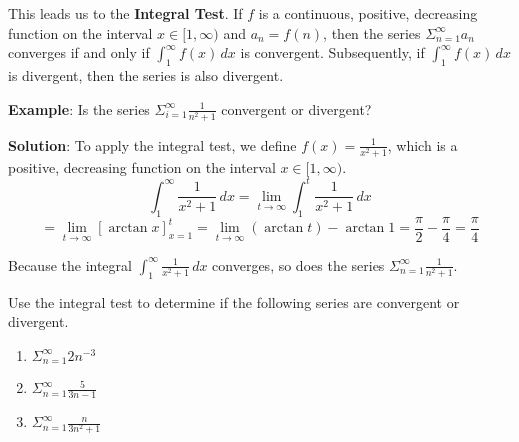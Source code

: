 This leads us to the \textbf{Integral Test}. If $f$ is a continuous, positive, 
decreasing function on the interval $x \in [1, \infty)$ and $a_n = f(n)$, then 
the series $\Sigma_{n=1}^\infty a_n$ converges if and only if $\int_1^\infty 
f(x)\,dx$ is convergent. Subsequently, if $\int_1^\infty f(x)\,dx$ is 
divergent, then the series is also divergent.

\textbf{Example}: Is the series $\Sigma_{i = 1}^\infty \frac{1}{n^2 + 1}$ 
convergent or divergent?

\textbf{Solution}: To apply the integral test, we define $f(x) = 
\frac{1}{x^2 + 1}$, which is a positive, decreasing function on the interval 
$x \in [1, \infty)$. 
$$\int_1^\infty \frac{1}{x^2 + 1}\,dx = \lim_{t \to \infty} \int_{1}^t 
\frac{1}{x^2 + 1}\,dx$$
$$= \lim_{t \to \infty} \left[ \arctan{x} \right]_{x = 1}^t = \lim_{t \to \infty} 
\left( \arctan{t} \right) - \arctan{1} = \frac{\pi}{2} - \frac{\pi}{4} = 
\frac{\pi}{4}$$

Because the integral $\int_1^\infty \frac{1}{x^2 + 1}\,dx$ converges, so does 
the series $\Sigma_{n = 1}^\infty \frac{1}{n^2 + 1}$. 

\begin{Exercise}[label = series1]
Use the integral test to determine if the following series are convergent or 
divergent. 
\begin{enumerate}
\item $\Sigma_{n = 1}^\infty 2n^{-3}$
\item $\Sigma_{n = 1}^\infty \frac{5}{3n-1}$
\item $\Sigma_{n = 1}^\infty \frac{n}{3n^2 + 1}$
\end{enumerate}
\vspace{40mm}
\end{Exercise}

